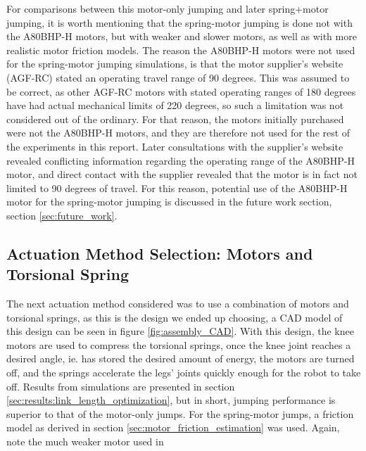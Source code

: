 For comparisons between this motor-only jumping and later spring+motor jumping, it is worth mentioning that the spring-motor jumping is done not with the A80BHP-H motors, but with weaker and slower motors, as well as with more realistic motor friction models. The reason the A80BHP-H motors were not used for the spring-motor jumping simulations, is that the motor supplier's website (AGF-RC) stated an operating travel range of 90 degrees. This was assumed to be correct, as other AGF-RC motors with stated operating ranges of 180 degrees have had actual mechanical limits of 220 degrees, so such a limitation was not considered out of the ordinary. For that reason, the motors initially purchased were not the A80BHP-H motors, and they are therefore not used for the rest of the experiments in this report. Later consultations with the supplier's website revealed conflicting information regarding the operating range of the A80BHP-H motor, and direct contact with the supplier revealed that the motor is in fact not limited to 90 degrees of travel. For this reason, potential use of the A80BHP-H motor for the spring-motor jumping is discussed in the future work section, section \ref{sec:future_work}. 


\subsection{Actuation Method Selection: Motors and Torsional Spring}

The next actuation method considered was to use a combination of motors and torsional springs, as this is the design we ended up choosing, a CAD model of this design can be seen in figure \ref{fig:assembly_CAD}. With this design, the knee motors are used to compress the torsional springs, once the knee joint reaches a desired angle, ie. has stored the desired amount of energy, the motors are turned off, and the springs accelerate the legs' joints quickly enough for the robot to take off. Results from simulations are presented in section \ref{sec:results:link_length_optimization}, but in short, jumping performance is superior to that of the motor-only jumps. For the spring-motor jumps, a friction model as derived in section \ref{sec:motor_friction_estimation} was used. Again, note the much weaker motor used in 


